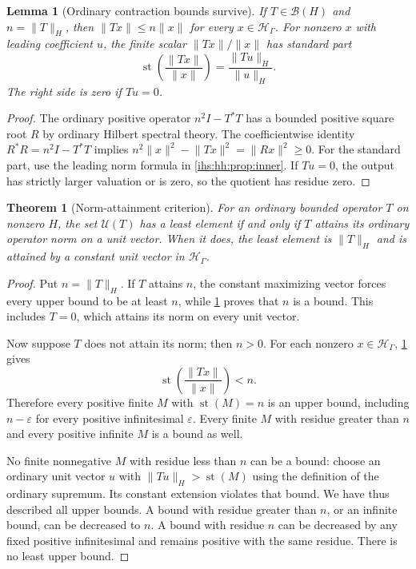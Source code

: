 \documentclass[11pt,a4paper]{article}
\numberwithin{equation}{section}
\newtheorem{theorem}{Theorem}[section]
\newtheorem{lemma}[lemma]{Lemma}
\theoremstyle{definition}
\theoremstyle{remark}
\newcommand{\Hil}{\mathcal H_\Gamma}
\newcommand{\B}{\mathcal B(H)}
\newcommand{\st}{\operatorname{st}}
\newcommand{\eps}{\varepsilon}
\newcommand{\norm}[1]{\lVert#1\rVert}
\begin{document}
\begin{lemma}[Ordinary contraction bounds survive]\label{ihs:hh:lem:contract}
If $T\in\B$ and $n=\norm{T}_H$, then $\norm{Tx}\le n\norm{x}$ for every
$x\in\Hil$. For nonzero $x$ with leading coefficient $u$, the finite scalar
$\norm{Tx}/\norm{x}$ has standard part
\[
 \st\!\left(\frac{\norm{Tx}}{\norm{x}}\right)
       =\frac{\norm{Tu}_H}{\norm{u}_H}.
\]
The right side is zero if $Tu=0$.
\end{lemma}
\begin{proof}
The ordinary positive operator $n^2I-T^*T$ has a bounded positive square
root $R$ by ordinary Hilbert spectral theory. The coefficientwise identity
$R^*R=n^2I-T^*T$ implies $n^2\norm{x}^2-\norm{Tx}^2=\norm{Rx}^2\ge0$. For
the standard part, use the leading norm formula in
\cref{ihs:hh:prop:inner}. If $Tu=0$, the output has strictly larger
valuation or is zero, so the quotient has residue zero.
\end{proof}

\begin{theorem}[Norm-attainment criterion]\label{ihs:hh:thm:norm}
For an ordinary bounded operator $T$ on nonzero $H$, the set $\mathcal U(T)$
has a least element if and only if $T$ attains its ordinary operator norm on
a unit vector. When it does, the least element is $\norm{T}_H$ and is
attained by a constant unit vector in $\Hil$.
\end{theorem}
\begin{proof}
Put $n=\norm{T}_H$. If $T$ attains $n$, the constant maximizing vector
forces every upper bound to be at least $n$, while
\cref{ihs:hh:lem:contract} proves that $n$ is a bound. This includes $T=0$,
which attains its norm on every unit vector.

Now suppose $T$ does not attain its norm; then $n>0$. For each nonzero
$x\in\Hil$, \cref{ihs:hh:lem:contract} gives
\[
 \st\!\left(\frac{\norm{Tx}}{\norm{x}}\right)<n.
\]
Therefore every positive finite $M$ with $\st(M)=n$ is an upper bound,
including $n-\eps$ for every positive infinitesimal $\eps$. Every finite $M$
with residue greater than $n$ and every positive infinite $M$ is a bound as
well.

No finite nonnegative $M$ with residue less than $n$ can be a bound: choose
an ordinary unit vector $u$ with $\norm{Tu}_H>\st(M)$ using the definition
of the ordinary supremum. Its constant extension violates that bound. We
have thus described all upper bounds. A bound with residue greater than $n$,
or an infinite bound, can be decreased to $n$. A bound with residue $n$ can
be decreased by any fixed positive infinitesimal and remains positive with
the same residue. There is no least upper bound.
\end{proof}
\end{document}
